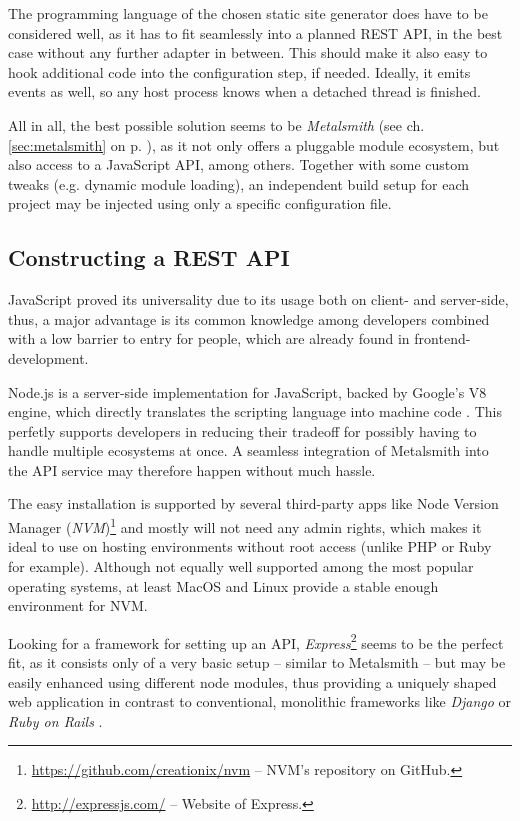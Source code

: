 The programming language of the chosen static site generator does have to be considered well, as it has to fit seamlessly into a planned REST API, in the best case without any further adapter in between. This should make it also easy to hook additional code into the configuration step, if needed. Ideally, it emits events as well, so any host process knows when a detached thread is finished.

All in all, the best possible solution seems to be \emph{Metalsmith} (see ch. \ref{sec:metalsmith} on p. \pageref{sec:metalsmith}), as it not only offers a pluggable module ecosystem, but also access to a JavaScript API, among others. Together with some custom tweaks (e.g. dynamic module loading), an independent build setup for each project may be injected using only a specific configuration file.


\subsection{Constructing a REST API}
\label{sec:primarythoughts-restapi}

JavaScript proved its universality due to its usage both on client- and server-side, thus, a major advantage is its common knowledge among developers combined with a low barrier to entry for people, which are already found in frontend-development.

Node.js is a server-side implementation for JavaScript, backed by Google's V8 engine, which directly translates the scripting language into machine code \cite[4]{cantelon2017node}. This perfetly supports developers in reducing their tradeoff for possibly having to handle multiple ecosystems at once. A seamless integration of Metalsmith into the API service may therefore happen without much hassle.

The easy installation is supported by several third-party apps like Node Version Manager (\emph{NVM})\footnote{\url{https://github.com/creationix/nvm} -- NVM's repository on GitHub.} and mostly will not need any admin rights, which makes it ideal to use on hosting environments without root access (unlike PHP or Ruby for example). Although not equally well supported among the most popular operating systems, at least MacOS and Linux provide a stable enough environment for NVM.

Looking for a framework for setting up an API, \emph{Express}\footnote{\url{http://expressjs.com/} -- Website of Express.} seems to be the perfect fit, as it consists only of a very basic setup -- similar to Metalsmith -- but may be easily enhanced using different node modules, thus providing a uniquely shaped web application in contrast to conventional, monolithic frameworks like \emph{Django} or \emph{Ruby on Rails} \cite[176]{cantelon2017node}.

